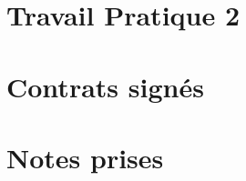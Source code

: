 \documentclass[letterpaper, oneside, 12pt, these, creativecommons]{thETS}
\begin{document}


\chapter{Travail Pratique 2}



\chapter{Contrats signés}









\chapter{Notes prises}










\end{document}
